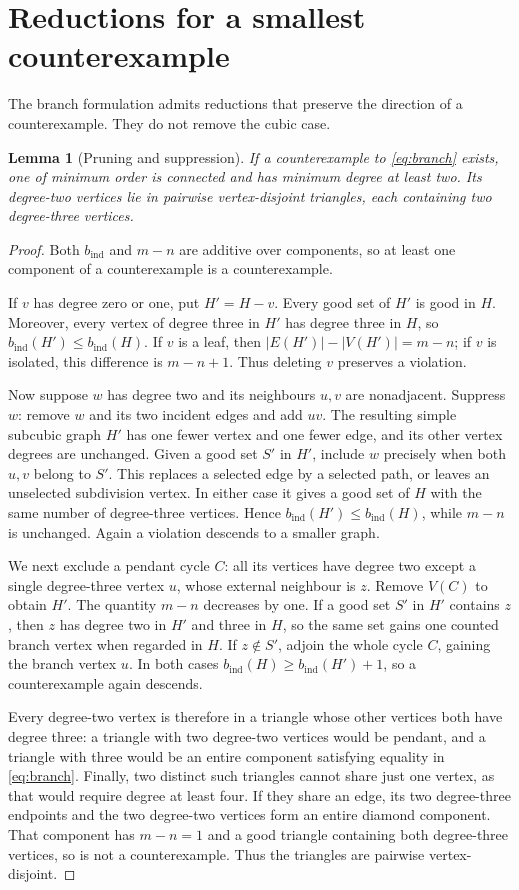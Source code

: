 \documentclass[11pt]{article}
\newtheorem{lemma}[theorem]{Lemma}
\newcommand{\bind}{b_{\mathrm{ind}}}
\begin{document}
\section{Reductions for a smallest counterexample}
The branch formulation admits reductions that preserve the direction
of a counterexample. They do not remove the cubic case.

\begin{lemma}[Pruning and suppression]\label{lem:suppression}
If a counterexample to \eqref{eq:branch} exists, one of minimum order
is connected and has minimum degree at least two. Its degree-two
vertices lie in pairwise vertex-disjoint triangles, each containing
two degree-three vertices.
\end{lemma}
\begin{proof}
Both $\bind$ and $m-n$ are additive over components, so at least one
component of a counterexample is a counterexample.

If $v$ has degree zero or one, put $H'=H-v$. Every good set of $H'$
is good in $H$. Moreover, every vertex of degree three in $H'$ has
degree three in $H$, so $\bind(H')\leq\bind(H)$. If $v$ is a leaf,
then $|E(H')|-|V(H')|=m-n$; if $v$ is isolated, this difference is
$m-n+1$. Thus deleting $v$ preserves a violation.

Now suppose $w$ has degree two and its neighbours $u,v$ are
nonadjacent. Suppress $w$: remove $w$ and its two incident edges and
add $uv$. The resulting simple subcubic graph $H'$ has one fewer
vertex and one fewer edge, and its other vertex degrees are unchanged.
Given a good set $S'$ in $H'$, include $w$ precisely when both $u,v$
belong to $S'$. This replaces a selected edge by a selected path, or
leaves an unselected subdivision vertex. In either case it gives a
good set of $H$ with the same number of degree-three vertices.
Hence $\bind(H')\leq\bind(H)$, while $m-n$ is unchanged.
Again a violation descends to a smaller graph.

We next exclude a pendant cycle $C$: all its vertices have degree two
except a single degree-three vertex $u$, whose external neighbour is
$z$. Remove $V(C)$ to obtain $H'$. The quantity $m-n$ decreases by
one. If a good set $S'$ in $H'$ contains $z$, then $z$ has degree
two in $H'$ and three in $H$, so the same set gains one counted
branch vertex when regarded in $H$. If $z\notin S'$, adjoin the
whole cycle $C$, gaining the branch vertex $u$. In both cases
$\bind(H)\geq\bind(H')+1$, so a counterexample again descends.

Every degree-two vertex is therefore in a triangle whose other
vertices both have degree three: a triangle with two degree-two
vertices would be pendant, and a triangle with three would be an
entire component satisfying equality in \eqref{eq:branch}.
Finally, two distinct such triangles cannot share just one vertex,
as that would require degree at least four. If they share an edge,
its two degree-three endpoints and the two degree-two vertices form
an entire diamond component. That component has $m-n=1$ and a good
triangle containing both degree-three vertices, so is not a
counterexample. Thus the triangles are pairwise vertex-disjoint.
\end{proof}
\end{document}
